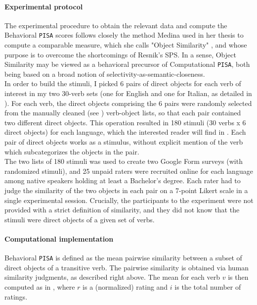 \paragraph{Experimental protocol}
The experimental procedure to obtain the relevant data and compute the Behavioral \texttt{PISA} scores follows closely the method Medina used in her thesis to compute a comparable measure, which she calls "Object Similarity" \parencite[173-178]{Medina2007}, and whose purpose is to overcome the shortcomings of Resnik's SPS. In a sense, Object Similarity may be viewed as a behavioral precursor of Computational \texttt{PISA}, both being based on a broad notion of selectivity-as-semantic-closeness.\\
In order to build the stimuli, I picked 6 pairs of direct objects for each verb of interest in my two 30-verb sets (one for English and one for Italian, as detailed in ). For each verb, the direct objects comprising the 6 pairs were randomly selected from the manually cleaned (see ) verb-object lists, so that each pair contained two different direct objects. This operation resulted in 180 stimuli (30 verbs x 6 direct objects) for each language, which the interested reader will find in . Each pair of direct objects works as a stimulus, without explicit mention of the verb which subcategorizes the objects in the pair.\\
The two lists of 180 stimuli was used to create two Google Form surveys (with randomized stimuli), and 25 unpaid raters were recruited online for each language among native speakers holding at least a Bachelor's degree. Each rater had to judge the similarity of the two objects in each pair on a 7-point Likert scale in a single experimental session. Crucially, the participants to the experiment were not provided with a strict definition of similarity, and they did not know that the stimuli were direct objects of a given set of verbs.

\paragraph{Computational implementation} Behavioral \texttt{PISA} is defined as the mean pairwise similarity between a subset of direct objects of a transitive verb. The pairwise similarity is obtained via human similarity judgments, as described right above. The mean for each verb $v$ is then computed as in , where $r$ is a (normalized) rating and $i$ is the total number of ratings.

